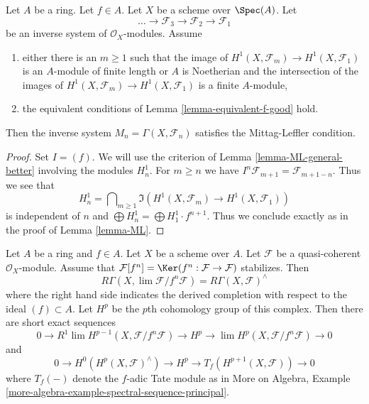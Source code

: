 \begin{lemma}
\label{lemma-ML-better}
Let $A$ be a ring. Let $f \in A$. Let $X$ be a scheme over $\Spec(A)$. Let
$$
\ldots \to \mathcal{F}_3 \to \mathcal{F}_2 \to \mathcal{F}_1
$$
be an inverse system of $\mathcal{O}_X$-modules. Assume
\begin{enumerate}
\item either there is an $m \geq 1$ such that the image of
$H^1(X, \mathcal{F}_m) \to H^1(X, \mathcal{F}_1)$
is an $A$-module of finite length or $A$ is Noetherian
and the intersection of the images of
$H^1(X, \mathcal{F}_m) \to H^1(X, \mathcal{F}_1)$
is a finite $A$-module,
\item the equivalent conditions of Lemma \ref{lemma-equivalent-f-good} hold.
\end{enumerate}
Then the inverse system $M_n = \Gamma(X, \mathcal{F}_n)$ satisfies the
Mittag-Leffler condition.
\end{lemma}

\begin{proof}
Set $I = (f)$. We will use the criterion of Lemma \ref{lemma-ML-general-better}
involving the modules $H^1_n$. For $m \geq n$ we have
$I^n\mathcal{F}_{m + 1} = \mathcal{F}_{m + 1 - n}$. Thus we see that
$$
H^1_n = \bigcap\nolimits_{m \geq 1} \Im\left(
H^1(X, \mathcal{F}_m) \to H^1(X, \mathcal{F}_1)
\right)
$$
is independent of $n$ and
$\bigoplus H^1_n = \bigoplus H^1_1 \cdot f^{n + 1}$.
Thus we conclude exactly as in the proof of Lemma \ref{lemma-ML}.
\end{proof}

\begin{lemma}
\label{lemma-formal-functions-principal}
\begin{reference}
\cite[Lemma 1.6]{Bhatt-local}
\end{reference}
Let $A$ be a ring and $f \in A$. Let $X$ be a scheme over $A$.
Let $\mathcal{F}$ be a quasi-coherent $\mathcal{O}_X$-module.
Assume that $\mathcal{F}[f^n] = \Ker(f^n : \mathcal{F} \to \mathcal{F})$
stabilizes. Then
$$
R\Gamma(X, \lim \mathcal{F}/f^n\mathcal{F}) =
R\Gamma(X, \mathcal{F})^\wedge
$$
where the right hand side indicates the derived completion
with respect to the ideal $(f) \subset A$. Let $H^p$ be the
$p$th cohomology group of this complex. Then there are short
exact sequences
$$
0 \to R^1\lim H^{p - 1}(X, \mathcal{F}/f^n\mathcal{F})
\to H^p \to \lim H^p(X, \mathcal{F}/f^n\mathcal{F}) \to 0
$$
and
$$
0 \to H^0(H^p(X, \mathcal{F})^\wedge) \to H^p \to
T_f(H^{p + 1}(X, \mathcal{F})) \to 0
$$
where $T_f(-)$ denote the $f$-adic Tate module as in
More on Algebra, Example
\ref{more-algebra-example-spectral-sequence-principal}.
\end{lemma}

